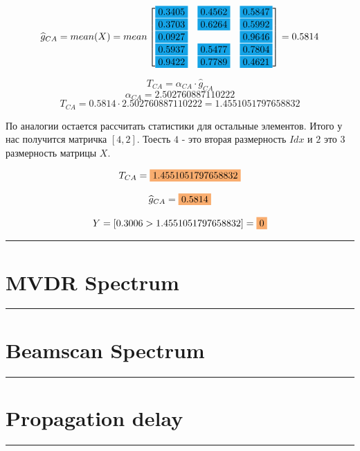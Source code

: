 \documentclass[a4paper,11pt]{article}
\begin{document}
		$$ \widehat{g}_{CA} = mean(X) = 
		mean\begin{bmatrix}
		 	\colorbox{Cerulean}{0.3405} & \colorbox{Cerulean}{0.4562} & \colorbox{Cerulean}{0.5847}\\
			\colorbox{Cerulean}{0.3703} & \colorbox{Cerulean}{0.6264} & \colorbox{Cerulean}{0.5992}\\
			\colorbox{Cerulean}{0.0927} & & \colorbox{Cerulean}{0.9646}\\
			\colorbox{Cerulean}{0.5937} & \colorbox{Cerulean}{0.5477} & \colorbox{Cerulean}{0.7804}\\
			\colorbox{Cerulean}{0.9422} & \colorbox{Cerulean}{0.7789} & \colorbox{Cerulean}{0.4621}\\
		\end{bmatrix} = 0.5814
		$$
		
		$$ T_{CA} = \alpha_{CA} \cdot \widehat{g}_{CA}$$
		$$  \alpha_{CA} = 2.502760887110222 $$
		$$ T_{CA} = 0.5814 \cdot 2.502760887110222 = 1.4551051797658832$$
	
		По аналогии остается рассчитать статистики для остальные элементов. Итого у нас получится матричка $[4, 2]$. Тоесть $4$ - это вторая размерность $Idx$ и $2$ это 3 размерность матрицы $X$. 
		
		\begin{framed}
			
			$$ T_{CA} =  \colorbox{Apricot}{1.4551051797658832}$$
			
			$$ \widehat{g}_{CA} =  \colorbox{Apricot}{0.5814}$$ 
			
			$$ Y = [0.3006 > 1.4551051797658832] = \colorbox{Apricot}{0}$$
		\end{framed}
	
		
		
	\noindent\rule{\textwidth}{2pt} 

	\section{MVDR Spectrum}
	
	\noindent\rule{\textwidth}{2pt} 
	\section{Beamscan Spectrum}
	\noindent\rule{\textwidth}{2pt} 
	
	\section{Propagation delay}
	\noindent\rule{\textwidth}{2pt} 
	
\end{document}
